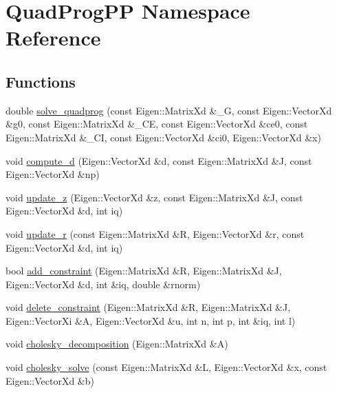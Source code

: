 \hypertarget{namespaceQuadProgPP}{}\section{Quad\+Prog\+PP Namespace Reference}
\label{namespaceQuadProgPP}
\subsection*{Functions}
\begin{DoxyCompactItemize}
\item 
double \hyperlink{namespaceQuadProgPP_a3660acf00652641e6b81b5106a44efbd}{solve\+\_\+quadprog} (const Eigen\+::\+Matrix\+Xd \&\+\_\+G, const Eigen\+::\+Vector\+Xd \&g0, const Eigen\+::\+Matrix\+Xd \&\+\_\+\+CE, const Eigen\+::\+Vector\+Xd \&ce0, const Eigen\+::\+Matrix\+Xd \&\+\_\+\+CI, const Eigen\+::\+Vector\+Xd \&ci0, Eigen\+::\+Vector\+Xd \&x)
\item 
void \hyperlink{namespaceQuadProgPP_aae5048e1bbd76bcc500c30288d1e3ee0}{compute\+\_\+d} (Eigen\+::\+Vector\+Xd \&d, const Eigen\+::\+Matrix\+Xd \&J, const Eigen\+::\+Vector\+Xd \&np)
\item 
void \hyperlink{namespaceQuadProgPP_ad1f10b211fb5b81828c9a8bb252ba732}{update\+\_\+z} (Eigen\+::\+Vector\+Xd \&z, const Eigen\+::\+Matrix\+Xd \&J, const Eigen\+::\+Vector\+Xd \&d, int iq)
\item 
void \hyperlink{namespaceQuadProgPP_a633fa931fb0b0d4cc2ba0dcb00cbf4b7}{update\+\_\+r} (const Eigen\+::\+Matrix\+Xd \&R, Eigen\+::\+Vector\+Xd \&r, const Eigen\+::\+Vector\+Xd \&d, int iq)
\item 
bool \hyperlink{namespaceQuadProgPP_a4096d7195aed4c795b80e5d923b43dc7}{add\+\_\+constraint} (Eigen\+::\+Matrix\+Xd \&R, Eigen\+::\+Matrix\+Xd \&J, Eigen\+::\+Vector\+Xd \&d, int \&iq, double \&rnorm)
\item 
void \hyperlink{namespaceQuadProgPP_aaec5402f2870ee1139e84ab41ef8a3e5}{delete\+\_\+constraint} (Eigen\+::\+Matrix\+Xd \&R, Eigen\+::\+Matrix\+Xd \&J, Eigen\+::\+Vector\+Xi \&A, Eigen\+::\+Vector\+Xd \&u, int n, int p, int \&iq, int l)
\item 
void \hyperlink{namespaceQuadProgPP_a4ef0115d81bd8076cbc5d7d7ca98f0d6}{cholesky\+\_\+decomposition} (Eigen\+::\+Matrix\+Xd \&A)
\item 
void \hyperlink{namespaceQuadProgPP_a63f00d297d24480490a750330a81e7ca}{cholesky\+\_\+solve} (const Eigen\+::\+Matrix\+Xd \&L, Eigen\+::\+Vector\+Xd \&x, const Eigen\+::\+Vector\+Xd \&b)
\item 

\end{DoxyCompactItemize}
